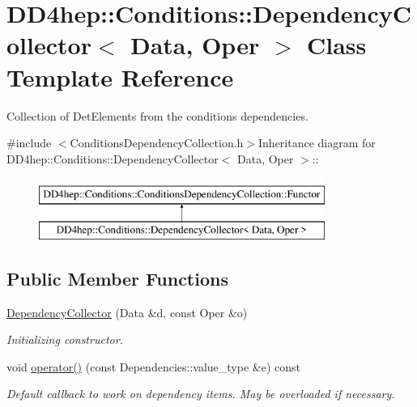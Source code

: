 \hypertarget{class_d_d4hep_1_1_conditions_1_1_dependency_collector}{
\section{DD4hep::Conditions::DependencyCollector$<$ Data, Oper $>$ Class Template Reference}
\label{class_d_d4hep_1_1_conditions_1_1_dependency_collector}
}


Collection of DetElements from the conditions dependencies.  


{\ttfamily \#include $<$ConditionsDependencyCollection.h$>$}Inheritance diagram for DD4hep::Conditions::DependencyCollector$<$ Data, Oper $>$::\begin{figure}[H]
\begin{center}
\leavevmode
\includegraphics[height=2cm]{class_d_d4hep_1_1_conditions_1_1_dependency_collector}
\end{center}
\end{figure}
\subsection*{Public Member Functions}
\begin{DoxyCompactItemize}
\item 
\hyperlink{class_d_d4hep_1_1_conditions_1_1_dependency_collector_a7631c949b34eeb87fa8aea7ea166c356}{DependencyCollector} (Data \&d, const Oper \&o)
\begin{DoxyCompactList}\small\item\em Initializing constructor. \item\end{DoxyCompactList}\item 
void \hyperlink{class_d_d4hep_1_1_conditions_1_1_dependency_collector_ad8e119796883e4557be7ef862fae7ac5}{operator()} (const Dependencies::value\_\-type \&e) const 
\begin{DoxyCompactList}\small\item\em Default callback to work on dependency items. May be overloaded if necessary. \item\end{DoxyCompactList}\end{DoxyCompactItemize}
